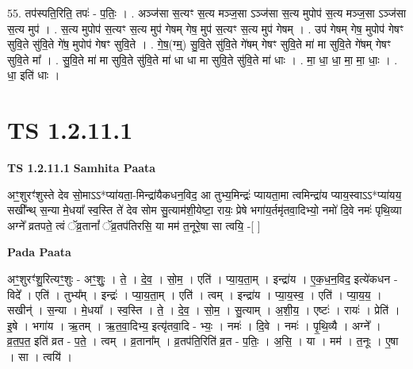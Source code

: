 \documentclass[17pt]{extarticle}
\begin{document}
55. तप॑स्पति॒रिति॒ तपः॑ - प॒तिः॒ । . अञ्ज॑सा स॒त्यꣳ स॒त्य मञ्ज॒सा ऽञ्ज॑सा स॒त्य मुपोप॑ स॒त्य मञ्ज॒सा ऽञ्ज॑सा स॒त्य मुप॑ । . स॒त्य मुपोप॑ स॒त्यꣳ स॒त्य मुप॑ गेषम् गेष॒ मुप॑ स॒त्यꣳ स॒त्य मुप॑ गेषम् । . उप॑ गेषम् गेष॒ मुपोप॑ गेषꣳ सुवि॒ते सु॑वि॒ते गे॑ष॒ मुपोप॑ गेषꣳ सुवि॒ते । . गे॒ष॒(ग्म्॒) सु॒वि॒ते सु॑वि॒ते गे॑षम् गेषꣳ सुवि॒ते मा॑ मा सुवि॒ते गे॑षम् गेषꣳ सुवि॒ते मा᳚ । . सु॒वि॒ते मा॑ मा सुवि॒ते सु॑वि॒ते मा॑ धा धा मा सुवि॒ते सु॑वि॒ते मा॑ धाः । . मा॒ धा॒ धा॒ मा॒ मा॒ धाः॒ । . धा॒ इति॑ धाः । \newline
\pagebreak
{}

\section{ TS 1.2.11.1 }

\textbf{TS 1.2.11.1 } \newline
\textbf{Samhita Paata} \newline

अꣳ॒॒शुरꣳ॑शुस्ते देव सो॒माऽऽ*प्या॑यता॒-मिन्द्रा॑यैकधन॒विद॒ आ तुभ्य॒मिन्द्रः॑ प्यायता॒मा त्वमिन्द्रा॑य प्याय॒स्वाऽऽ*प्या॑यय॒ सखी᳚न्थ् स॒न्या मे॒धया᳚ स्व॒स्ति ते॑ देव सोम सु॒त्याम॑शी॒येष्टा॒ रायः॒ प्रेषे भगा॑य॒र्तमृ॑तवा॒दिभ्यो॒ नमो॑ दि॒वे नमः॑ पृथि॒व्या अग्ने᳚ व्रतपते॒ त्वं ॅव्र॒तानां᳚ ॅव्र॒तप॑तिरसि॒ या मम॑ त॒नूरे॒षा सा त्वयि॒ -[ ] \newline

\textbf{Pada Paata} \newline

अꣳ॒॒शुरꣳ॑शु॒रित्यꣳ॒॒शुः - अꣳ॒॒शुः॒ । ते॒ । दे॒व॒ । सो॒म॒ । एति॑ । प्या॒य॒ता॒म् । इन्द्रा॑य । ए॒क॒ध॒न॒विद॒ इत्ये॑कधन - विदे᳚ । एति॑ । तुभ्य᳚म् । इन्द्रः॑ । प्या॒य॒ता॒म् । एति॑ । त्वम् । इन्द्रा॑य । प्या॒य॒स्व॒ । एति॑ । प्या॒य॒य॒ । सखीन्॑ । स॒न्या । मे॒धया᳚ । स्व॒स्ति । ते॒ । दे॒व॒ । सो॒म॒ । सु॒त्याम् । अ॒शी॒य॒ । एष्टः॑ । रायः॑ । प्रेति॑ । इ॒षे । भगा॑य । ऋ॒तम् । ऋ॒त॒वा॒दिभ्य॒ इत्यृ॑तवा॒दि - भ्यः॒ । नमः॑ । दि॒वे । नमः॑ । पृ॒थि॒व्यै । अग्ने᳚ । व्र॒त॒प॒त॒ इति॑ व्रत - प॒ते॒ । त्वम् । व्र॒ताना᳚म् । व्र॒तप॑ति॒रिति॑ व्र॒त - प॒तिः॒ । अ॒सि॒ । या । मम॑ । त॒नूः । ए॒षा । सा । त्वयि॑ ।  \newline
\end{document}
